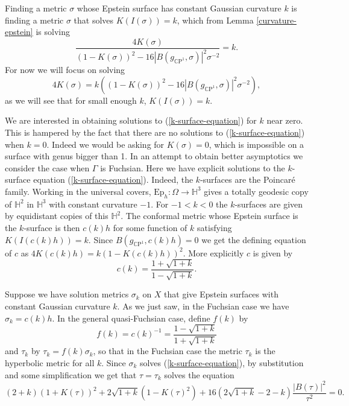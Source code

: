 \documentclass{amsart}
\newcommand{\CP}{\mathbb{C}\mathrm{P}}
\renewcommand{\H}{\mathbb{H}}
\begin{document}
Finding a metric $\sigma$ whose Epstein surface has constant Gaussian curvature $k$ is finding a metric $\sigma$ that solves $K(I(\sigma)) = k$, which from Lemma \ref{curvature-epstein} is solving
\[
\frac{4K(\sigma)}{(1-K(\sigma))^2 - 16|B(g_{\CP^1},\sigma)|^2\sigma^{-2}} = k.
\]
For now we will focus on solving
\begin{equation}
\label{k-surface-equation}
4K(\sigma) = k \left((1-K(\sigma))^2 - 16|B(g_{\CP^1},\sigma)|^2\sigma^{-2} \right),
\end{equation}
as we will see that for small enough $k$, $K(I(\sigma)) = k$.

We are interested in obtaining solutions to (\ref{k-surface-equation}) for $k$ near zero. 
This is hampered by the fact that there are no solutions to (\ref{k-surface-equation}) when $k = 0$. 
Indeed we would be asking for $K(\sigma)=0$, which is impossible on a surface with genus bigger than 1. 
In an attempt to obtain better asymptotics we consider the case when $\Gamma$ is Fuchsian. 
Here we have explicit solutions to the $k$-surface equation (\ref{k-surface-equation}).
Indeed, the $k$-surfaces are the Poincar\'e family. 
Working in the universal covers, $\mathrm{Ep}_h : \Omega \to \H^3$ gives a totally geodesic copy of $\H^2$ in $\H^3$ with constant curvature $-1$. 
For $-1<k<0$  the $k$-surfaces are given by equidistant copies of this $\H^2$. 
The conformal metric whose Epstein surface is the $k$-surface is then $c(k)h$ for some function of $k$ satisfying $K(I(c(k)h)) = k$. 
Since $B(g_{\CP^1},c(k)h) = 0$ we get the defining equation of $c$ as $4K(c(k)h) = k(1 - K(c(k)h))^2$.
More explicitly $c$ is given by
\[
c(k) = \frac{1+\sqrt{1+k}}{1-\sqrt{1+k}}.
\]


Suppose we have solution metrics $\sigma_k$  on $X$ that give Epstein surfaces with constant Gaussian curvature $k$. 
As we just saw, in the Fuchsian case we have $\sigma_k = c(k) h$.  
In the general quasi-Fuchsian case, define $f(k)$ by 
\[
f(k) = c(k)^{-1} = \frac{1-\sqrt{1+k}}{1+\sqrt{1+k}}
\] 
and $\tau_k$ by $\tau_k = f(k)\sigma_k$, so that in the Fuchsian case the metric $\tau_k$ is the hyperbolic metric for all $k$. 
Since $\sigma_k$ solves (\ref{k-surface-equation}), by substitution and some simplification we get that $\tau = \tau_k$ solves the equation 
\begin{equation}
\label{scaled-equation}
(2+k)(1+K(\tau))^2 + 2\sqrt{1+k}\left(1-K(\tau)^2\right) + 16\left(2\sqrt{1+k} - 2 - k  \right)\frac{|B(\tau)|^2}{\tau^2} = 0.
\end{equation}
\end{document}
